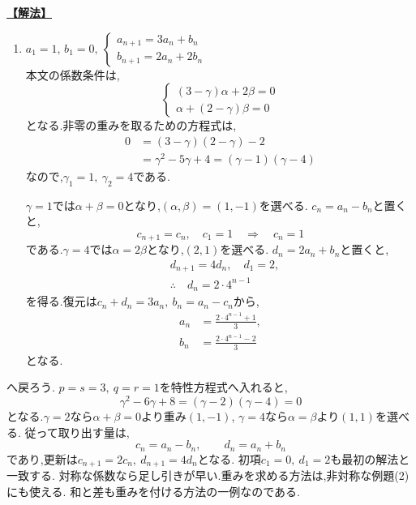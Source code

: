     \noindent \hyperlink{book:example-system-1:problem:2}{\textbf{【解法】}}\par\nobreak
    \begin{enumerate}[start=2,label=(\arabic*),parsep=3pt,format=\bookitemlink{example-system-1}{solution}{problem}]
      \item $\displaystyle a_1=1,\,b_1=0,\ \begin{cases}a_{n+1}=3a_n+b_n\\ b_{n+1}=2a_n+2b_n\end{cases}$\\
          本文の係数条件は,
          \[
            \begin{cases}
              (3-\gamma)\alpha+2\beta=0\\
              \alpha+(2-\gamma)\beta=0
            \end{cases}
          \]
          となる.非零の重みを取るための方程式は,
          \begin{align*}
            0&=(3-\gamma)(2-\gamma)-2\\
            &=\gamma^2-5\gamma+4=(\gamma-1)(\gamma-4)
          \end{align*}
          なので,$\gamma_1=1,\ \gamma_2=4$である.

          $\gamma=1$では$\alpha+\beta=0$となり,$(\alpha,\beta)=(1,-1)$を選べる.
          $c_n=a_n-b_n$と置くと,
          \[
            c_{n+1}=c_n,\quad c_1=1
            \quad\Longrightarrow\quad c_n=1
          \]
          である.$\gamma=4$では$\alpha=2\beta$となり,$(2,1)$を選べる.
          $d_n=2a_n+b_n$と置くと,
          \[
            \begin{aligned}
              &d_{n+1}=4d_n,\quad d_1=2,\\
              &\therefore\quad d_n=2\cdot4^{n-1}
            \end{aligned}
          \]
          を得る.復元は$c_n+d_n=3a_n,\ b_n=a_n-c_n$から,
          \begin{align*}
            a_n&=\frac{2\cdot4^{n-1}+1}{3},\\
            b_n&=\frac{2\cdot4^{n-1}-2}{3}
          \end{align*}
          となる.
    \end{enumerate}

    へ戻ろう.
    $p=s=3,\ q=r=1$を特性方程式へ入れると,
    \[
      \gamma^2-6\gamma+8=(\gamma-2)(\gamma-4)=0
    \]
    となる.$\gamma=2$なら$\alpha+\beta=0$より重み$(1,-1)$,
    $\gamma=4$なら$\alpha=\beta$より$(1,1)$を選べる.
    従って取り出す量は,
    \[
      c_n=a_n-b_n,\qquad d_n=a_n+b_n
    \]
    であり,更新は$c_{n+1}=2c_n,\ d_{n+1}=4d_n$となる.
    初項$c_1=0,\ d_1=2$も最初の解法と一致する.
    対称な係数なら足し引きが早い.重みを求める方法は,非対称な例題(2)にも使える.
    和と差も重みを付ける方法の一例なのである.
